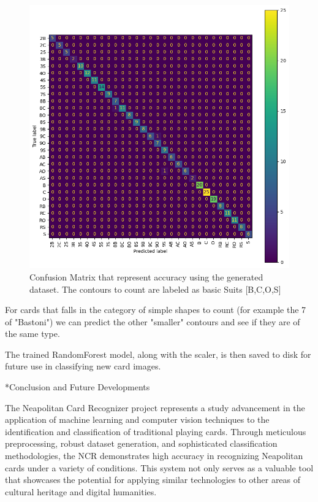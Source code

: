 \documentclass[twocolumn, a4paper,10pt]{article}
\makeatletter
\renewcommand\section{\@startsection{section}{1}{\z@}{3pt}{3pt}{\normalfont\large\bfseries}}
\makeatother
\begin{document}
\begin{figure}
  \centering
  \includegraphics[scale=0.4]{img/confusionMatrix.png}
  \caption{Confusion Matrix that represent accuracy using the generated dataset. The contours to count are labeled as basic Suits [B,C,O,S]}
  \label{fig:c_matrix}
\end{figure}

For cards that falls in the category of simple shapes to count (for example the 7 of "Bastoni") we can predict the other "smaller" contours and see if they are of the same type.

The trained RandomForest model, along with the scaler, is then saved to disk for future use in classifying new card images.

\section*{Conclusion and Future Developments}

The Neapolitan Card Recognizer project represents a study advancement in the application of machine learning and computer vision techniques to the identification and classification of traditional playing cards. Through meticulous preprocessing, robust dataset generation, and sophisticated classification methodologies, the NCR demonstrates high accuracy in recognizing Neapolitan cards under a variety of conditions. This system not only serves as a valuable tool that showcases the potential for applying similar technologies to other areas of cultural heritage and digital humanities.
\end{document}
